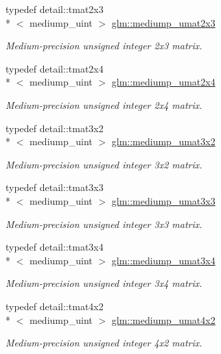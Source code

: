 \begin{DoxyCompactItemize}
typedef detail\-::tmat2x3\\*
$<$ mediump\-\_\-uint $>$ \hyperlink{group__gtc__matrix__integer_gaa377342a4abe7f415218710e531b2731}{glm\-::mediump\-\_\-umat2x3}
\begin{DoxyCompactList}\small\item\em Medium-\/precision unsigned integer 2x3 matrix. \end{DoxyCompactList}\item 
typedef detail\-::tmat2x4\\*
$<$ mediump\-\_\-uint $>$ \hyperlink{group__gtc__matrix__integer_ga62b45add166ab5be4e325a2cadec240d}{glm\-::mediump\-\_\-umat2x4}
\begin{DoxyCompactList}\small\item\em Medium-\/precision unsigned integer 2x4 matrix. \end{DoxyCompactList}\item 
typedef detail\-::tmat3x2\\*
$<$ mediump\-\_\-uint $>$ \hyperlink{group__gtc__matrix__integer_gaa8022553d8ad1a133f9ebe75a50dbee1}{glm\-::mediump\-\_\-umat3x2}
\begin{DoxyCompactList}\small\item\em Medium-\/precision unsigned integer 3x2 matrix. \end{DoxyCompactList}\item 
typedef detail\-::tmat3x3\\*
$<$ mediump\-\_\-uint $>$ \hyperlink{group__gtc__matrix__integer_ga51665c5e422b057ca25a67a939c78ceb}{glm\-::mediump\-\_\-umat3x3}
\begin{DoxyCompactList}\small\item\em Medium-\/precision unsigned integer 3x3 matrix. \end{DoxyCompactList}\item 
typedef detail\-::tmat3x4\\*
$<$ mediump\-\_\-uint $>$ \hyperlink{group__gtc__matrix__integer_gac432c4520a4843bd269d4393a19031a4}{glm\-::mediump\-\_\-umat3x4}
\begin{DoxyCompactList}\small\item\em Medium-\/precision unsigned integer 3x4 matrix. \end{DoxyCompactList}\item 
typedef detail\-::tmat4x2\\*
$<$ mediump\-\_\-uint $>$ \hyperlink{group__gtc__matrix__integer_gaa1c11ec784503a43fbf8f52f5ed47ef1}{glm\-::mediump\-\_\-umat4x2}
\begin{DoxyCompactList}\small\item\em Medium-\/precision unsigned integer 4x2 matrix. \end{DoxyCompactList}\item 

\end{DoxyCompactItemize}
